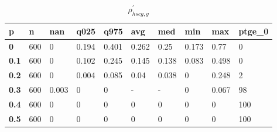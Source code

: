 \begin{table}[h]
 \centering 
\footnotesize
\caption{$\rho_{hscg,g}^\prime $}
\label{tab:alphahscgg}
\begin{tabular}[h]{|l|l|l|l|l|l|l|l|l|l|
    } \hline
\textbf{ p} & \textbf{ n} & \textbf{ nan} & \textbf{ q025} & \textbf{ q975} & \textbf{ avg} & \textbf{ med} & \textbf{ min} & \textbf{ max} & \textbf{ ptge\_0}
    \\ \hline
  \textbf{  0} & 600 &     0 & 0.194 & 0.401 & 0.262 &  0.25 & 0.173 &  0.77 &   0
    \\ \hline
  \textbf{0.1} & 600 &     0 & 0.102 & 0.245 & 0.145 & 0.138 & 0.083 & 0.498 &   0
    \\ \hline
  \textbf{0.2} & 600 &     0 & 0.004 & 0.085 &  0.04 & 0.038 &     0 & 0.248 &   2
    \\ \hline
  \textbf{0.3} & 600 & 0.003 &     0 &     0 & - & - &     0 & 0.067 &  98
    \\ \hline
  \textbf{0.4} & 600 &     0 &     0 &     0 &     0 &     0 &     0 &     0 & 100
    \\ \hline
  \textbf{0.5} & 600 &     0 &     0 &     0 &     0 &     0 &     0 &     0 & 100
    \\ \hline
 \end{tabular}
 \end{table}
